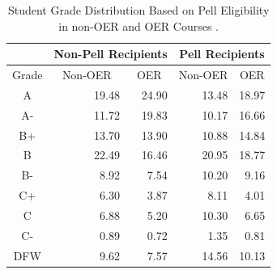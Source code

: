 \documentclass[11pt]{article}
\begin{document}
\begin{table}
\centering
\begin{tabular}{crrrr}
  & \multicolumn{2}{c}{Non-Pell Recipients} & \multicolumn{2}{c}{Pell Recipients} \\ \hline
  \multicolumn{1}{c}{Grade} & \multicolumn{1}{c}{Non-OER} & \multicolumn{1}{c}{OER} & \multicolumn{1}{c}{Non-OER} & \multicolumn{1}{c}{OER}\\ \hline
  A\hspace{1.1ex} & 19.48 & 24.90 & 13.48 & 18.97 \\
  A-\hspace{0.7ex} & 11.72 & 19.83 & 10.17 & 16.66 \\
  B+ & 13.70 & 13.90 & 10.88 & 14.84 \\
  B\hspace{1.1ex} & 22.49 & 16.46 & 20.95 & 18.77 \\
  B-\hspace{0.7ex} & 8.92 & 7.54 & 10.20 & 9.16 \\
  C+ & 6.30 & 3.87 & 8.11 & 4.01 \\
  C\hspace{1.1ex} & 6.88 & 5.20 & 10.30 & 6.65 \\
  C-\hspace{0.8ex} & 0.89 & 0.72 & 1.35 & 0.81 \\
  DFW & 9.62 & 7.57 & 14.56 & 10.13 \\ \hline
\end{tabular}
\caption{Student Grade Distribution Based on Pell Eligibility in non-OER and OER Courses \cite{CB-WC-PH:18}.}
\label{tab:pell-oer}
\end{table}
\end{document}
